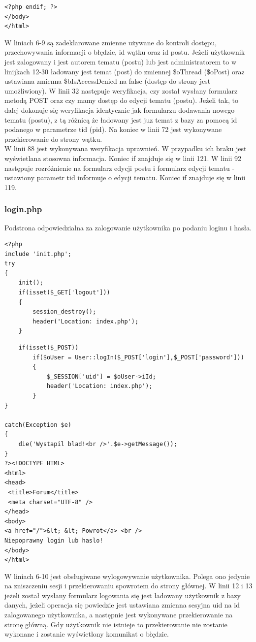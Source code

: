 \documentclass[a4paper,10pt]{article}
\begin{document}
{\begin{verbatim}
<?php endif; ?>
</body>
</html>
\end{verbatim}
W liniach 6-9 są zadeklarowane zmienne używane do kontroli dostępu, przechowywania informacji o błędzie, id wątku oraz id postu. Jeżeli użytkownik jest zalogowany i jest autorem tematu (postu) lub jest administratorem to w linijkach 12-30 ładowany jest temat (post) do zmiennej \$oThread (\$oPost) oraz ustawiana zmienna \$bIsAccessDenied na false (dostęp do strony jest umożliwiony). W linii 32 następuje weryfikacja, czy został wysłany formularz metodą POST oraz czy mamy dostęp do edycji tematu (postu). Jeżeli tak, to dalej dokonuje się weryfikacja identycznie jak formularzu dodawania nowego tematu (postu), z tą różnicą że ładowany jest juz temat z bazy za pomocą id podanego w parametrze tid (pid). Na koniec w linii 72 jest wykonywane przekierowanie do strony wątku.\\
W linii 88 jest wykonywana weryfikacja uprawnień. W przypadku ich braku jest wyświetlana stosowna informacja. Koniec if znajduje się w linii 121. W linii 92 następuje rozróżnienie na formularz edycji postu i formularz edycji tematu - ustawiony parametr tid informuje o edycji tematu. Koniec if znajduje się w linii 119.
\subsubsection{login.php}
Podstrona odpowiedzialna za zalogowanie użytkownika po podaniu loginu i hasła. \\
\begin{verbatim}
<?php
include 'init.php';
try
{
	init();
	if(isset($_GET['logout']))
	{
		session_destroy();
		header('Location: index.php');
	}
\end{verbatim}
\begin{verbatim}
	if(isset($_POST))
		if($oUser = User::logIn($_POST['login'],$_POST['password']))
		{
			$_SESSION['uid'] = $oUser->iId;
			header('Location: index.php');
		}			
}

catch(Exception $e)
{
	die('Wystapil blad!<br />'.$e->getMessage());
}
?><!DOCTYPE HTML>
<html>
<head>
 <title>Forum</title>
 <meta charset="UTF-8" />
</head>
<body>
<a href="/">&lt; &lt; Powrot</a> <br />
Niepoprawny login lub haslo!
</body>
</html>
\end{verbatim}
W liniach 6-10 jest obsługiwane wylogowywanie użytkownika. Polega ono jedynie na zniszczeniu sesji i przekierowaniu spowrotem do strony głównej. W linii 12 i 13 jeżeli został wysłany formularz logowania się jest ładowany użytkownik z bazy danych, jeżeli operacja się powiedzie jest ustawiana zmienna sesyjna uid na id zalogowanego użytkownika, a następnie jest wykonywane przekierowanie na stronę główną. Gdy użytkownik nie istnieje to przekierowanie nie zostanie wykonane i zostanie wyświetlony komunikat o błędzie.
}
\end{document}
